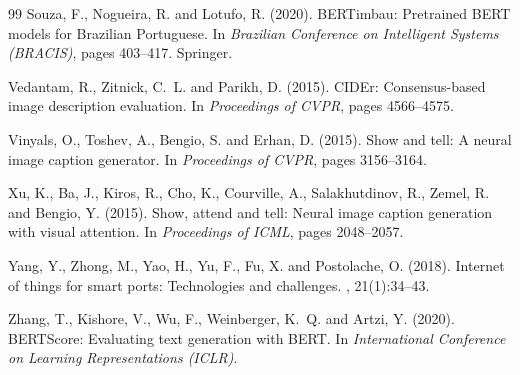 \begin{thebibliography}{99}
Souza, F., Nogueira, R. and Lotufo, R. (2020).
\newblock BERTimbau: Pretrained BERT models for Brazilian Portuguese.
\newblock In {\em Brazilian Conference on Intelligent Systems (BRACIS)}, pages 403--417. Springer.

Vedantam, R., Zitnick, C.~L. and Parikh, D. (2015).
\newblock CIDEr: Consensus-based image description evaluation.
\newblock In {\em Proceedings of CVPR}, pages 4566--4575.

Vinyals, O., Toshev, A., Bengio, S. and Erhan, D. (2015).
\newblock Show and tell: A neural image caption generator.
\newblock In {\em Proceedings of CVPR}, pages 3156--3164.

Xu, K., Ba, J., Kiros, R., Cho, K., Courville, A., Salakhutdinov, R., Zemel, R. and Bengio, Y. (2015).
\newblock Show, attend and tell: Neural image caption generation with visual attention.
\newblock In {\em Proceedings of ICML}, pages 2048--2057.

Yang, Y., Zhong, M., Yao, H., Yu, F., Fu, X. and Postolache, O. (2018).
\newblock Internet of things for smart ports: Technologies and challenges.
, 21(1):34--43.

Zhang, T., Kishore, V., Wu, F., Weinberger, K.~Q. and Artzi, Y. (2020).
\newblock BERTScore: Evaluating text generation with BERT.
\newblock In {\em International Conference on Learning Representations (ICLR)}.

\end{thebibliography}
